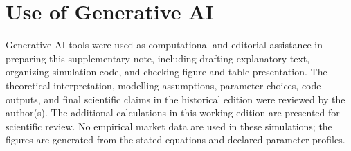 \documentclass[11pt]{article}
\begin{document}
\section*{Use of Generative AI}

Generative AI tools were used as computational and editorial assistance in
preparing this supplementary note, including drafting explanatory text,
organizing simulation code, and checking figure and table presentation. The
theoretical interpretation, modelling assumptions, parameter choices, code
outputs, and final scientific claims in the historical edition were reviewed by the author(s). The additional calculations in this working edition are presented for scientific review. No empirical market data are used in
these simulations; the figures are generated from the stated equations and
declared parameter profiles.
\end{document}
